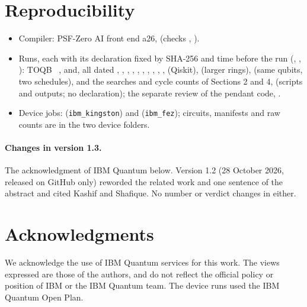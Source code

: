 \documentclass[11pt]{article}
\begin{document}
\section{Reproducibility}
\sloppy

\begin{itemize}
\item Compiler: PSF-Zero AI front end a26,  (checks ,
).
\item Runs, each with its declaration fixed by SHA-256 and time before the run (,
, ): TOQB \cite{toqb} \ , and, all dated
, , , , , , ,
, , ,  (Qiskit),  (larger rings),  (same qubits, two schedules), and the searches and cycle counts of Sections 2 and 4,  (scripts and outputs; no declaration); the separate review of the pendant code,
.
\item Device jobs:  (\texttt{ibm\_kingston}) and 
(\texttt{ibm\_fez}); circuits, manifests and raw counts are in the two device folders.
\end{itemize}

\paragraph{Changes in version 1.3.} The acknowledgment of IBM Quantum below. Version 1.2 (28 October 2026, released on
GitHub only) reworded the related work and one sentence of the abstract and cited Kashif and Shafique. No number or
verdict changes in either.

\section*{Acknowledgments}
We acknowledge the use of IBM Quantum services for this work. The views expressed are those of the authors, and do
not reflect the official policy or position of IBM or the IBM Quantum team. The device runs used the IBM Quantum
Open Plan.
\end{document}
